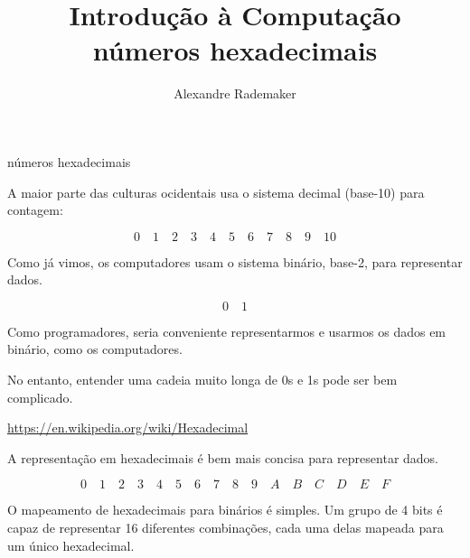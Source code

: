 \documentclass{beamer}
\title{Introdução à Computação \\ números hexadecimais}
\author{Alexandre Rademaker}
\date{}
\begin{document}
\begin{frame}
 \maketitle
\end{frame}


\begin{frame}{números hexadecimais}

  A maior parte das culturas ocidentais usa o sistema decimal
  (base-10) para contagem:

  \[ 0 \quad 1 \quad 2 \quad 3 \quad 4 \quad 5 \quad 6 \quad 7 \quad 8 \quad 9 \quad 10 \]

  Como já vimos, os computadores usam o sistema binário, base-2, para
  representar dados.

  \[ 0 \quad 1 \]

  \framebreak

  Como programadores, seria conveniente representarmos e usarmos os
  dados em binário, como os computadores.

  No entanto, entender uma cadeia muito longa de 0s e 1s pode ser bem
  complicado.

  \url{https://en.wikipedia.org/wiki/Hexadecimal}

  \framebreak

  A representação em hexadecimais é bem mais concisa para representar
  dados.

  \[
    0 \quad 1 \quad 2 \quad 3 \quad 4 \quad 5 \quad 6 \quad 7 \quad 8 \quad 9 \quad A \quad B \quad C \quad D \quad E \quad F 
  \]

  O mapeamento de hexadecimais para binários é simples. Um grupo de 4
  bits é capaz de representar 16 diferentes combinações, cada uma
  delas mapeada para um único hexadecimal.

  \framebreak


\end{frame}
\end{document}
